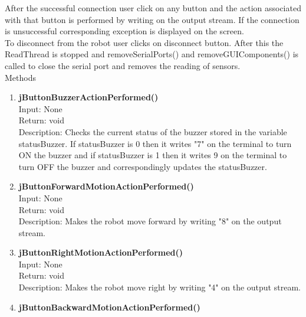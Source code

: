 \documentclass{article}
\begin{document}
    After the successful connection user click on any button and the action associated with that button is performed  by writing on the output stream. If the connection is unsuccessful corresponding exception is displayed on the screen. \newline \\ 
    To disconnect from the robot user clicks on disconnect button. After this the ReadThread is stopped and removeSerialPorts() and removeGUIComponents() is called to close the serial port and removes the reading of sensors.\\
    \vspace{1cm}
	{\huge Methods} \vspace{1cm}
	\begin{enumerate}
		\item \textbf{jButtonBuzzerActionPerformed()} \vspace{0.25cm} \\
		Input: None\\
		Return: void\\
		Description: Checks the current status of  the buzzer stored in the variable statusBuzzer. If statusBuzzer is 0 then it writes "7" on the terminal to turn ON the buzzer and if statusBuzzer is 1 then it writes 9 on the terminal to turn OFF the buzzer and correspondingly updates the statusBuzzer.\vspace{0.5cm}\\
		\item \textbf{jButtonForwardMotionActionPerformed()} \vspace{0.25cm} \\
		Input: None\\
		Return: void\\
		Description: Makes the robot move forward by writing "8" on the output stream. \vspace{0.5cm} \\
		\item \textbf{jButtonRightMotionActionPerformed()} \vspace{0.25cm}\\
		Input: None\\
		Return: void\\
		Description: Makes the robot move right by writing "4" on the output stream. \vspace{0.5cm} \\
		\newpage
		\item \textbf{jButtonBackwardMotionActionPerformed()} \vspace{0.25cm} \\

\end{enumerate}
\end{document}
